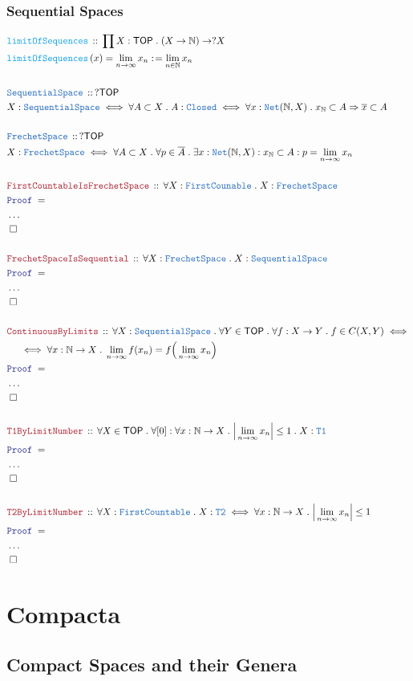 \documentclass[12pt]{scrartcl}
\newcommand{\TYPE}[1]{\textcolor{NavyBlue}{\mathtt{#1}}}
\newcommand{\FUNC}[1]{\textcolor{Cerulean}{\mathtt{#1}}}
\newcommand{\LOGIC}[1]{\textcolor{Blue}{\mathtt{#1}}}
\newcommand{\THM}[1]{\textcolor{Maroon}{\mathtt{#1}}}
\renewcommand{\.}{\; . \;}
\newcommand{\de}{: \kern 0.1pc =}
\newcommand{\Act}[1]{\left( #1 \right)}
\newcommand{\Theorem}[2]{& \THM{#1} \, :: \, #2 \\ & \Proof = \\ }
\newcommand{\DeclareType}[2]{& \TYPE{#1} \, :: \, #2 \\}
\newcommand{\DefineType}[3]{& #1 : \TYPE{#2} \iff #3 \\}
\newcommand{\DeclareFunc}[2]{& \FUNC{#1} \, :: \, #2 \\}
\newcommand{\DefineNamedFunc}[4]{&  \FUNC{#1}\Act{#2} = #3 \de #4 \\}
\newcommand{\NewLine}{\\ & \kern 1pc}
\newcommand{\Page}[1]{ \begin{align*} #1 \end{align*}   }
\newcommand{\NoProof}{ & \ldots \\ \EndProof}
\newcommand{\Imply}{\Rightarrow}
\newcommand{\Nat}{\mathbb{N} }
\newcommand{\QED}{\; \square}
\newcommand{\EndProof}{& \QED \\}
\newcommand{\Proof}{\LOGIC{Proof} \; }
\newcommand{\TOP}{\mathsf{TOP}}
\begin{document}
\subsubsection{Sequential Spaces}
\Page{
	\DeclareFunc{limitOfSequences}
	{
		\prod X : \TOP \. 
		(X \to \Nat) \to ?X
	}
	\DefineNamedFunc{limitOfSequences}
	{ x }{ \lim_{n \to \infty} x_n  }{\lim_{n \in \Nat} x_n}
	\\
	\DeclareType{SequentialSpace}
	{
		?\TOP
	}
	\DefineType{X}{SequentialSpace}
	{
		\forall A \subset X \.
		A : \TYPE{Closed} \iff 
		\forall x : \TYPE{Net}(\Nat, X) \. x_{\Nat} \subset A \Imply \overline{x} \subset A
	}
	\\
	\DeclareType{FrechetSpace}
	{
		?\TOP
	}
	\DefineType{X}{FrechetSpace}
	{
		\forall A \subset X \.
		\forall p \in \overline{A} \.
		\exists x : \TYPE{Net}(\Nat,X) : x_\Nat \subset A : p = \lim_{n \to \infty} x_n
	}
	\\
	\Theorem{FirstCountableIsFrechetSpace}
	{
		\forall X : \TYPE{FirstCounable} \.
		X : \TYPE{FrechetSpace} 
	}
	\NoProof
	\\
	\Theorem{FrechetSpaceIsSequential}
	{
		\forall X : \TYPE{FrechetSpace} \.
		X : \TYPE{SequentialSpace} 
	}
	\NoProof
	\\
	\Theorem{ContinuousByLimits}
	{
		\forall X : \TYPE{SequentialSpace} \.
		\forall Y \in \TOP \.
		\forall f : X \to Y  \.
		f \in C(X,Y)
		\iff \NewLine \iff
		\forall x : \Nat \to X \.
		\lim_{n \to \infty} f(x_n) = f\Big( \lim_{n \to \infty} x_n \Big)
	}
	\NoProof
	\\
	\Theorem{T1ByLimitNumber}
	{
		\forall X \in \TOP \.
		\forall [0] : \forall x : \Nat \to X \. 
		\Big|\lim_{n \to \infty} x_n\Big| \le 1 \.
		X : \TYPE{T1}
	}
	\NoProof
	\\
	\Theorem{T2ByLimitNumber}
	{
		\forall X : \TYPE{FirstCountable} \.
		X : \TYPE{T2} 
		\iff
		\forall x : \Nat \to X \. \Big| \lim_{n\to\infty} x_n \Big| \le 1
	}
	\NoProof
}
\newpage
\section{Compacta}
\subsection{Compact Spaces and their Genera}
\end{document}
